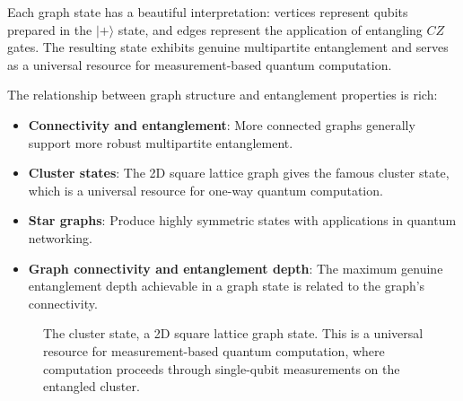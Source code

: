 \documentclass[12pt,a4paper]{article}
\begin{document}
Each graph state has a beautiful interpretation: vertices represent qubits prepared in the $|+\rangle$ state, and edges represent the application of entangling $CZ$ gates. The resulting state exhibits genuine multipartite entanglement and serves as a universal resource for measurement-based quantum computation.

The relationship between graph structure and entanglement properties is rich:
\begin{itemize}
	\item \textbf{Connectivity and entanglement}: More connected graphs generally support more robust multipartite entanglement.
	\item \textbf{Cluster states}: The 2D square lattice graph gives the famous cluster state, which is a universal resource for one-way quantum computation.
	\item \textbf{Star graphs}: Produce highly symmetric states with applications in quantum networking.
	\item \textbf{Graph connectivity and entanglement depth}: The maximum genuine entanglement depth achievable in a graph state is related to the graph's connectivity.
\end{itemize}

\begin{figure}[htbp]
	\centering
	\caption{The cluster state, a 2D square lattice graph state. This is a universal resource for measurement-based quantum computation, where computation proceeds through single-qubit measurements on the entangled cluster.}
	\label{fig:cluster-state}
\end{figure}
\end{document}
